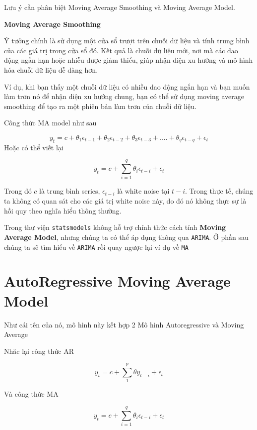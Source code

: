 \documentclass[
]{book}
\renewenvironment{quote}{\begin{VF}}{\end{VF}}
\begin{document}
Lưu ý cần phân biệt Moving Average Smoothing và Moving Average Model.

\textbf{Moving Average Smoothing}

\begin{quote}
Ý tưởng chính là sử dụng một cửa sổ trượt trên chuỗi dữ liệu và tính trung bình của các giá trị trong cửa sổ đó. Kết quả là chuỗi dữ liệu mới, nơi mà các dao động ngắn hạn hoặc nhiễu được giảm thiểu, giúp nhận diện xu hướng và mô hình hóa chuỗi dữ liệu dễ dàng hơn.
\end{quote}

\begin{quote}
Ví dụ, khi bạn thấy một chuỗi dữ liệu có nhiều dao động ngắn hạn và bạn muốn làm trơn nó để nhận diện xu hướng chung, bạn có thể sử dụng moving average smoothing để tạo ra một phiên bản làm trơn của chuỗi dữ liệu.
\end{quote}

Công thức MA model như sau

\[
y_t = c + \theta_1 \epsilon_{t-1} + \theta_2 \epsilon_{t-2} + \theta_3 \epsilon_{t-3} + .... + \theta_q \epsilon_{t-q} + \epsilon_t 
\]
Hoặc có thể viết lại

\[
y_t = c  + \sum^{q}_{i=1}\theta_{i}\epsilon_{t-i} +  \epsilon_t
\]

Trong đó \(c\) là trung bình series, \(\epsilon_{t-i}\) là white noise tại \(t-i\). Trong thực tế, chúng ta không có quan sát cho các giá trị white noise này, do đó nó không thực sự là hồi quy theo nghĩa hiểu thông thường.

Trong thư viện \texttt{statsmodels} không hỗ trợ chính thức cách tính \textbf{Moving Average Model}, nhưng chúng ta có thể áp dụng thông qua \texttt{ARIMA}. Ở phần sau chúng ta sẽ tìm hiểu về \texttt{ARIMA} rồi quay ngược lại ví dụ về \texttt{MA}

\hypertarget{autoregressive-moving-average-model}{%
\section{AutoRegressive Moving Average Model}\label{autoregressive-moving-average-model}}

Như cái tên của nó, mô hình này kết hợp 2 Mô hình Autoregressive và Moving Average

Nhăc lại công thức AR

\[
y_t = c + \sum^{p}_{1}\theta y_{t-i} + \epsilon_t
\]

Và công thức MA

\[
y_t = c  + \sum^{q}_{i=1}\theta_{i}\epsilon_{t-i} +  \epsilon_t
\]
\end{document}
